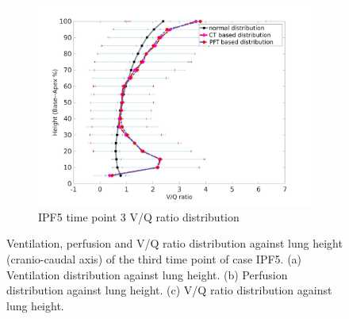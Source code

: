 \begin{figure}[htbp]
\begin{subfigure}{.6\linewidth}
  \includegraphics[width=\linewidth,trim={{.0\wd0} {.0\wd0} {.0\wd0} {.0\wd0}},clip]{Appendix/Image_AppexB/IPF513/IPF513_VQAgainstLungHeight.png}
  \caption{IPF5 time point 3 V/Q ratio distribution}
  \label{fig:VQDistribution-c}
\end{subfigure}
\caption{ Ventilation, perfusion and V/Q ratio distribution against lung height (cranio-caudal axis) of the third time point of case IPF5. (a) Ventilation distribution against lung height. (b) Perfusion distribution against lung height. (c) V/Q ratio distribution against lung height.}
\label{fig:VQDistribution}
\end{figure}

